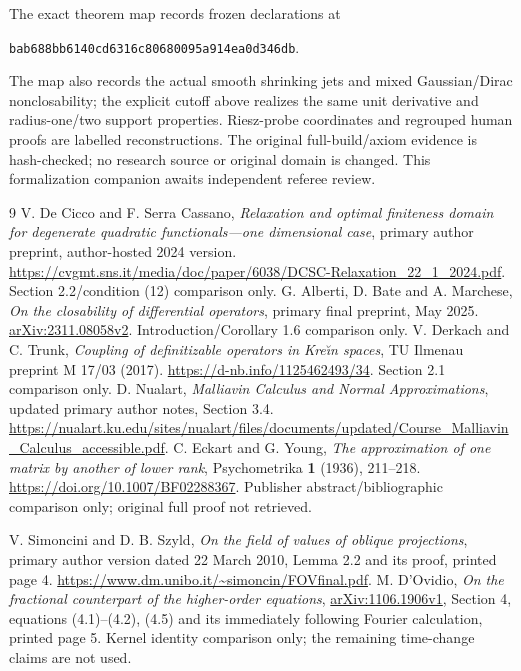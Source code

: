 \documentclass[11pt]{article}
\begin{document}
The exact theorem map records frozen declarations at
\begin{center}\texttt{\small bab688bb6140cd6316c80680095a914ea0d346db}.\end{center}
The map also records the actual smooth shrinking jets and mixed
Gaussian/Dirac nonclosability; the explicit cutoff above realizes
the same unit derivative and radius-one/two support properties.
Riesz-probe coordinates and regrouped human proofs are labelled
reconstructions. The original full-build/axiom evidence is
hash-checked; no research source or original domain is changed.
This formalization companion awaits independent referee review.

\begin{thebibliography}{9}
 V. De Cicco and F. Serra Cassano,
\emph{Relaxation and optimal finiteness domain for degenerate
quadratic functionals---one dimensional case}, primary author
preprint, author-hosted 2024 version.
\url{https://cvgmt.sns.it/media/doc/paper/6038/DCSC-Relaxation_22_1_2024.pdf}.
Section 2.2/condition (12) comparison only.
 G. Alberti, D. Bate and A. Marchese,
\emph{On the closability of differential operators},
primary final preprint, May 2025.
\href{https://arxiv.org/abs/2311.08058}{arXiv:2311.08058v2}.
Introduction/Corollary 1.6 comparison only.
 V. Derkach and C. Trunk,
\emph{Coupling of definitizable operators in Kre\u\i n spaces},
TU Ilmenau preprint M 17/03 (2017).
\url{https://d-nb.info/1125462493/34}.
Section 2.1 comparison only.
 D. Nualart, \emph{Malliavin Calculus and Normal Approximations},
updated primary author notes, Section 3.4.
\url{https://nualart.ku.edu/sites/nualart/files/documents/updated/Course_Malliavin_Calculus_accessible.pdf}.
 C. Eckart and G. Young,
\emph{The approximation of one matrix by another of lower rank},
Psychometrika \textbf{1} (1936), 211--218.
\url{https://doi.org/10.1007/BF02288367}.
Publisher abstract/bibliographic comparison only; original full proof not retrieved.

 V. Simoncini and D. B. Szyld,
\emph{On the field of values of oblique projections}, primary author
version dated 22 March 2010, Lemma 2.2 and its proof, printed page 4.
\url{https://www.dm.unibo.it/~simoncin/FOVfinal.pdf}.
 M. D'Ovidio,
\emph{On the fractional counterpart of the higher-order equations},
\href{https://arxiv.org/abs/1106.1906}{arXiv:1106.1906v1}, Section 4,
equations (4.1)--(4.2), (4.5) and its immediately following Fourier
calculation, printed page 5. Kernel identity comparison only; the
remaining time-change claims are not used.
\end{thebibliography}
\end{document}
